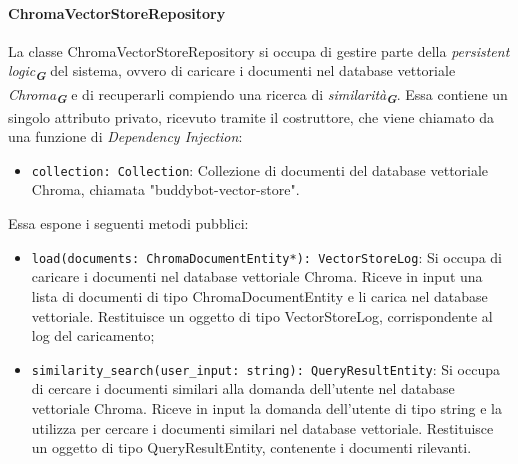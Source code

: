 \paragraph{ChromaVectorStoreRepository}
\label{sec:chroma_vector_store_repository}
La classe ChromaVectorStoreRepository si occupa di gestire parte della \emph{persistent logic}\textsubscript{\textbf{\textit{G}}} del sistema, ovvero di caricare i documenti nel database vettoriale \emph{Chroma}\textsubscript{\textbf{\textit{G}}} e di recuperarli compiendo una ricerca di \emph{similarità}\textsubscript{\textbf{\textit{G}}}. Essa contiene un singolo attributo privato, ricevuto tramite il costruttore, che viene chiamato da una funzione di \emph{Dependency Injection}:
\begin{itemize}
    \item \texttt{collection: Collection}: Collezione di documenti del database vettoriale Chroma, chiamata "buddybot-vector-store".
\end{itemize}
Essa espone i seguenti metodi pubblici:
\begin{itemize}
    \item \texttt{load(documents: ChromaDocumentEntity*): VectorStoreLog}: Si occupa di caricare i documenti nel database vettoriale Chroma. Riceve in input una lista di documenti di tipo ChromaDocumentEntity e li carica nel database vettoriale. Restituisce un oggetto di tipo VectorStoreLog, corrispondente al log del caricamento;
    \item \texttt{similarity\_search(user\_input: string): QueryResultEntity}: Si occupa di cercare i documenti similari alla domanda dell'utente nel database vettoriale Chroma. Riceve in input la domanda dell'utente di tipo string e la utilizza per cercare i documenti similari nel database vettoriale. Restituisce un oggetto di tipo QueryResultEntity, contenente i documenti rilevanti.
\end{itemize}


